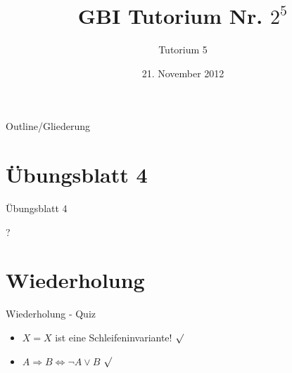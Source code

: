 

\title[Tutorium 5]{GBI Tutorium Nr. $2^5$}
\subtitle{Tutorium 5}
\date{21. November 2012}






	\begin{frame}
		\titlepage
	\end{frame}

	\begin{frame}{Outline/Gliederung}
		\tableofcontents
	\end{frame}
	
	
	\section{\"Ubungsblatt 4}
	\begin{frame} {Übungsblatt 4}
		\begin{center}
			\Huge ?
		\end{center}
	\end{frame}	
		
	
	
	
	\section{Wiederholung} 
	\begin{frame} {Wiederholung - Quiz}
		\begin{itemize}
			\item $X=X$ ist eine Schleifeninvariante! 
			\only<2-> {\color{darkgreen}$\surd$}\\
			\color{black}
			
			\item $A \Rightarrow B \Leftrightarrow \neg A \lor B$
			\only<2-> {\color{darkgreen}$\surd$}\\
			\color{black}
		\end{itemize}
	\end{frame}
	
	
	
